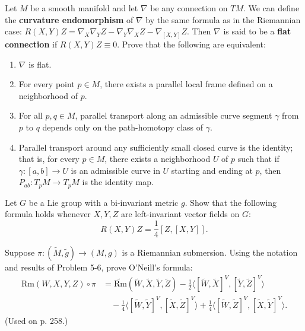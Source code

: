 \begin{exercise}
\label{prob:flat-connection}
Let $M$ be a smooth manifold and let $\nabla$ be any connection on $TM$. We can define the \textbf{curvature endomorphism} of $\nabla$ by the same formula as in the Riemannian case: $R(X,Y)Z = \nabla_X \nabla_Y Z - \nabla_Y \nabla_X Z - \nabla_{[X,Y]}Z$. Then $\nabla$ is said to be a \textbf{flat connection} if $R(X,Y)Z \equiv 0$. Prove that the following are equivalent:
\begin{enumerate}
\item[(a)] $\nabla$ is flat.
\item[(b)] For every point $p \in M$, there exists a parallel local frame defined on a neighborhood of $p$.
\item[(c)] For all $p,q \in M$, parallel transport along an admissible curve segment $\gamma$ from $p$ to $q$ depends only on the path-homotopy class of $\gamma$.
\item[(d)] Parallel transport around any sufficiently small closed curve is the identity; that is, for every $p \in M$, there exists a neighborhood $U$ of $p$ such that if $\gamma : [a,b] \to U$ is an admissible curve in $U$ starting and ending at $p$, then $P_{ab} : T_p M \to T_p M$ is the identity map.
\end{enumerate}
\end{exercise}

\begin{exercise}
\label{prob:lie-group-curvature}
Let $G$ be a Lie group with a bi-invariant metric $g$. Show that the following formula holds whenever $X, Y, Z$ are left-invariant vector fields on $G$:
\[
R(X,Y)Z = \frac{1}{4}[Z,[X,Y]].
\]
\end{exercise}

\begin{exercise}
\label{prob:oneill-formula}
Suppose $\pi : (\tilde{M}, \tilde{g}) \to (M, g)$ is a Riemannian submersion. Using the notation and results of Problem 5-6, prove O'Neill's formula:
\begin{align*}
\mathrm{Rm}(W, X, Y, Z) \circ \pi &= \widetilde{\mathrm{Rm}}(\tilde{W}, \tilde{X}, \tilde{Y}, \tilde{Z}) - \frac{1}{2}\langle[\tilde{W}, \tilde{X}]^V, [\tilde{Y}, \tilde{Z}]^V\rangle \\
&\quad - \frac{1}{4}\langle[\tilde{W}, \tilde{Y}]^V, [\tilde{X}, \tilde{Z}]^V\rangle + \frac{1}{4}\langle[\tilde{W}, \tilde{Z}]^V, [\tilde{X}, \tilde{Y}]^V\rangle.
\end{align*}
(Used on p. 258.)
\end{exercise}

